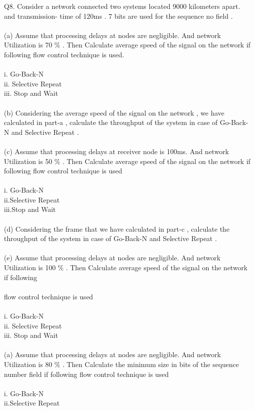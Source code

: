 \documentclass[a4paper,12pt]{article}
\begin{document}
 
Q8. Consider a network connected two systems located 9000 kilometers apart. and transmission-
  time of 120ms . 7 bits are used for the sequence no field .\\\\
(a) Assume that processing delays at nodes are negligible. And network Utilization is
70 \% . Then Calculate average speed of the signal on the network if following flow
control technique is used.\\\\
i. Go-Back-N\\
ii. Selective Repeat\\
iii. Stop and Wait\\\\
(b) Considering the average speed of the signal on the network , we have calculated in
part-a , calculate the throughput of the system in case of Go-Back-N and Selective
Repeat .\\\\
(c) Assume that processing delays at receiver node is 100ms. And network Utilization
is 50 \% . Then Calculate average speed of the signal on the network if following flow
control technique is used\\\\
i. Go-Back-N\\
ii.Selective Repeat\\
iii.Stop and Wait\\\\
(d) Considering the frame that we have calculated in part-c , calculate the throughput
of the system in case of Go-Back-N and Selective Repeat .\\\\
(e) Assume that processing delays at nodes are negligible. And network Utilization is
100 \% . Then Calculate average speed of the signal on the network if following\\\\
flow control technique is used\\\\
i. Go-Back-N\\
ii. Selective Repeat\\
iii. Stop and Wait\\\\

(a) Assume that processing delays at nodes are negligible. And network Utilization is
80 \% . Then Calculate the minimum size in bits of the sequence number field if following
flow control technique is used\\\\
i. Go-Back-N\\
ii.Selective Repeat\\\\
\end{document}
